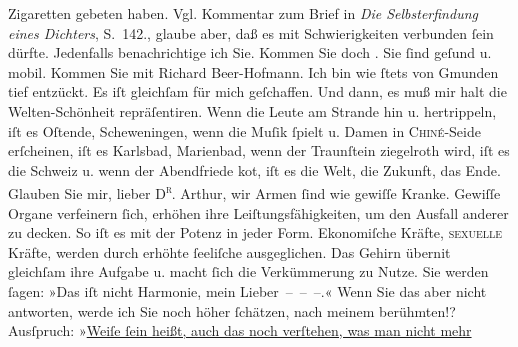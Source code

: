 \begin{ledgroupsized}[t]{13cm}
{{{                        Zigaretten gebeten haben. Vgl. Kommentar zum Brief in \emph{Die Selbsterfindung eines Dichters}, S. 142.}}}\label{K_L00468_1h}, glaube aber, daß es mit Schwierigkeiten verbunden ſein dürfte.
                    Jedenfalls benachrichtige ich Sie. Kommen Sie doch \label{K_L00468_2v}\label{K_L00468_2h}. Sie ſind geſund u. mobil.
                    Kommen Sie mit Richard Beer-Hofmann. Ich bin
                    wie ſtets von Gmunden tief entzückt. Es iſt
                    gleichſam für {\pb}mich geſchaffen. Und
                    dann, es muß mir halt die Welten-Schönheit 
                    repräſentiren. Wenn die Leute am Strande hin u. hertrippeln, iſt es Oſtende, Sch\introOben{}e\introOben{}weningen, wenn die Muſik ſpielt u. Damen in
                        \textsc{Chiné}-Seide erſcheinen, iſt es Karlsbad, Marienbad, wenn
                    der Traunſtein ziegelroth wird, iſt es die Schweiz u. wenn der Abendfriede ko{\geminationm}t, iſt  es die
                         Welt, die Zukunft, \introOben{}das
                        Ende.\introOben{} Glauben Sie mir, lieber \textsc{D\textsuperscript{r}}. Arthur, wir Armen ſind wie gewiſſe {\pb}Kranke. Gewiſſe Organe verfeinern
                    ſich, erhöhen ihre Leiſtungsfähigkeiten, um den Ausfall anderer zu decken. So
                    iſt es mit der Potenz in jeder Form. Ekonomiſche Kräfte, \textsc{sexuelle} Kräfte, werden durch erhöhte ſeeliſche ausgeglichen. Das
                    Gehirn überni{\geminationm}t gleichſam ihre Aufgabe u. macht
                    ſich die Verkümmerung zu Nutze.\pend
           \pstart
           Sie werden ſagen: »Das iſt nicht Harmonie, mein Lieber – – –.« {\pb}Wenn Sie das aber nicht antworten,
                    werde ich Sie noch höher ſchätzen, nach meinem berühmten\introOben{}!?\introOben{} Ausſpruch: »\uline{Weiſe ſein heißt,  auch das noch verſtehen, was man nicht mehr
}
\end{ledgroupsized}

